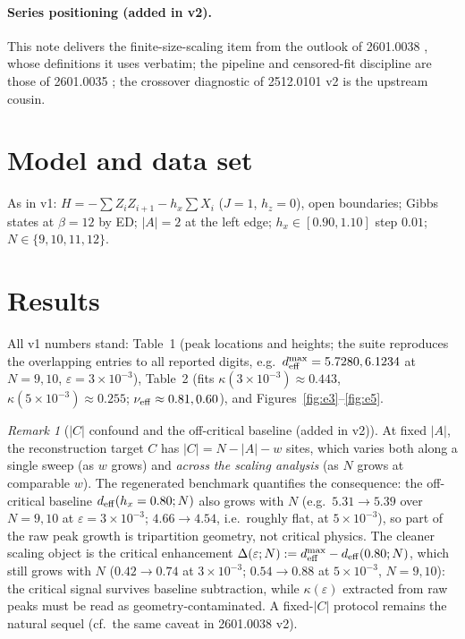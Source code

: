 \documentclass[11pt]{article}
\theoremstyle{remark}
\newtheorem{remark}{Remark}[section]
\newcommand{\deff}{d_{\rm eff}}
\newcommand{\dmax}{d^{\max}_{\rm eff}}
\begin{document}
\paragraph{Series positioning (added in v2).} This note delivers the
finite-size-scaling item from the outlook of 2601.0038 \cite{S0038},
whose definitions it uses verbatim; the pipeline and censored-fit
discipline are those of 2601.0035 \cite{S0035}; the crossover diagnostic
of 2512.0101 v2 \cite{S0101} is the upstream cousin.

\section{Model and data set}
As in v1: $H = -\sum Z_iZ_{i+1} - h_x \sum X_i$ ($J = 1$, $h_z = 0$),
open boundaries; Gibbs states at $\beta = 12$ by ED; $|A| = 2$ at the
left edge; $h_x \in [0.90, 1.10]$ step $0.01$; $N \in \{9, 10, 11, 12\}$.

\section{Results}
All v1 numbers stand: Table~1 (peak locations and heights; the suite
reproduces the overlapping entries to all reported digits, e.g.\
$\dmax = 5.7280, 6.1234$ at $N = 9, 10$, $\varepsilon = 3\times10^{-3}$),
Table~2 (fits $\kappa(3\times10^{-3}) \approx 0.443$,
$\kappa(5\times10^{-3}) \approx 0.255$; $\nu_{\rm eff} \approx 0.81,
0.60$), and Figures~\ref{fig:e3}--\ref{fig:e5}.

\begin{remark}[$|C|$ confound and the off-critical baseline (added in
v2)]
\label{rem:baseline}
At fixed $|A|$, the reconstruction target $C$ has $|C| = N - |A| - w$
sites, which varies both along a single sweep (as $w$ grows) and
\emph{across the scaling analysis} (as $N$ grows at comparable $w$).
The regenerated benchmark quantifies the consequence: the off-critical
baseline $\deff(h_x = 0.80; N)$ also grows with $N$ (e.g.\ $5.31 \to
5.39$ over $N = 9, 10$ at $\varepsilon = 3\times10^{-3}$; $4.66 \to
4.54$, i.e.\ roughly flat, at $5\times10^{-3}$), so part of the raw peak
growth is tripartition geometry, not critical physics. The cleaner
scaling object is the critical enhancement $\Delta(\varepsilon; N) :=
\dmax - \deff(0.80; N)$, which still grows with $N$ ($0.42 \to 0.74$ at
$3\times10^{-3}$; $0.54 \to 0.88$ at $5\times10^{-3}$, $N = 9, 10$): the
critical signal survives baseline subtraction, while
$\kappa(\varepsilon)$ extracted from raw peaks must be read as
geometry-contaminated. A fixed-$|C|$ protocol remains the natural
sequel (cf.\ the same caveat in 2601.0038 v2).
\end{remark}
\end{document}
